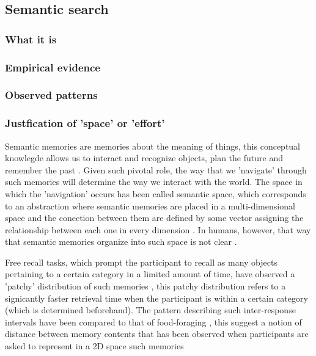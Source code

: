 \documentclass[11pt]{article}
\begin{document}
\subsection{Semantic search}
\label{sec:orgad61c1d}
\subsubsection{What it is}
\label{sec:org304827d}
\subsubsection{Empirical evidence}
\label{sec:orga96d8d6}
\subsubsection{Observed patterns}
\label{sec:org6cc66f8}
\subsubsection{Justfication of 'space' or 'effort'}
\label{sec:org3292c49}
Semantic memories are memories about the meaning of things, this conceptual
knowlegde allows us to interact and recognize objects, plan the future and
remember the past \citep{binderNeurobiologySemanticMemory2011}. Given such pivotal
role, the way that we 'navigate' through such memories will determine the way we
interact with the world. The space in which the 'navigation' occurs has been
called semantic space, which corresponds to an abstraction where semantic
memories are placed in a multi-dimensional space and the conection between them
are defined by some vector assigning the relationship between each one in every
dimension \citep{lundProducingHighdimensionalSemantic1996a}. In humans, however,
that way that semantic memories organize into such space is not clear
\citep{benedekHowSemanticMemory2017}.  

Free recall tasks, which prompt the participant to recall as many objects
pertaining to a certain category in a limited amount of time, have observed a
'patchy' distribution of such memories \citep{hillsOptimalForagingSemantic2009},
this patchy distribution refers to a signicantly faster retrieval time when the
participant is within a certain category (which is determined beforehand). The
pattern describing such inter-response intervals have been compared to that of
food-foraging \citep{rhodesHumanMemoryRetrieval2007a}, this suggest a notion of
distance between memory contents that has been observed when participants are
asked to represent in a 2D space such memories \citep{montezRoleSemanticClustering2015} 
\end{document}
